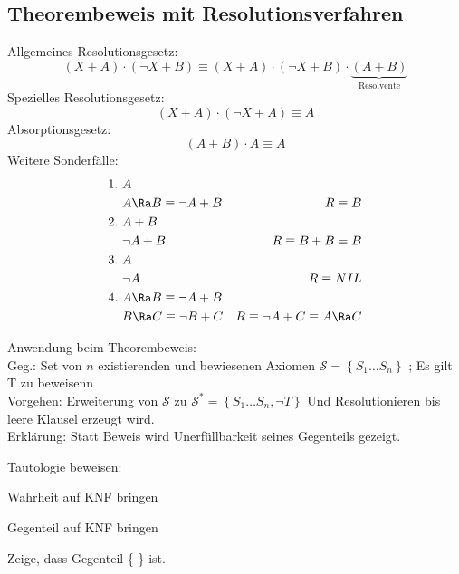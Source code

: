 \documentclass[german,color,6pt]{latex4ei/latex4ei_sheet}
\begin{document}
\begin{sectionbox}
\subsection{Theorembeweis mit Resolutionsverfahren}
Allgemeines Resolutionsgesetz:\\
\begin{equation*}
	(X + A) \cdot (\neg X + B) \equiv (X + A) \cdot (\neg X + B) \cdot \underbrace{(A + B)}_{\text{Resolvente}}
\end{equation*}
Spezielles Resolutionsgesetz:
\begin{equation*}
	(X + A) \cdot (\neg X + A) \equiv A
\end{equation*}
Absorptionsgesetz:
\begin{equation*}
	(A + B) \cdot A \equiv A
\end{equation*}
Weitere Sonderfälle:
\begin{equation*}
\begin{aligned}
1.\ & A \\
& A \Ra B \equiv \neg A + B & R \equiv B \\
2.\ & A + B \\
& \neg A + B & R \equiv B + B = B \\
3.\ & A \\
& \neg A & R \equiv NIL \\
4.\ & A \Ra B \equiv \neg A + B \\
& B \Ra C \equiv \neg B + C & R \equiv \neg A + C \equiv A \Ra C\\
\end{aligned}
\end{equation*}

%

Anwendung beim Theorembeweis: \\
Geg.: Set von $n$ existierenden und bewiesenen Axiomen $\mathcal S = \left\{S_1 \dots S_n \right\}$ ; Es gilt T zu beweisenn\\
Vorgehen: Erweiterung von $\mathcal S $ zu $\mathcal S^* = \left\{S_1 \dots S_n , \neg T \right\}$ Und Resolutionieren bis leere Klausel erzeugt wird. \\
Erklärung: Statt Beweis wird Unerfüllbarkeit seines Gegenteils gezeigt.

\begin{cookbox}{Tautologie beweisen: }
	\item Wahrheit auf KNF bringen
	\item Gegenteil auf KNF bringen
	\item Zeige, dass Gegenteil \{ \} ist.
\end{cookbox}
\end{sectionbox}
\end{document}
